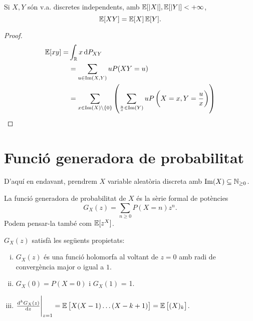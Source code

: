 \begin{lema}
    Si $X,Y$ són v.a. discretes independents, amb $\operatorname{\mathbb{E}}[|X|], \operatorname{\mathbb{E}}[|Y|] < +\infty$,
    \[\operatorname{\mathbb{E}}[XY] = \operatorname{\mathbb{E}}[X]\operatorname{\mathbb{E}}[Y].\]
\end{lema}
\begin{proof}
    \[\begin{aligned}
    \esp[xy] =& \int_\real x\dif P_{XY} \\
    &= \sum_{u\in\im(X,Y)}{uP(XY=u)} \\
    &= \sum_{x\in\im(X)\setminus\{0\}} \lp\sum_{\frac{u}{x}\in\im(Y)} uP\lp X=x,Y=\frac{u}{x} \rp\rp
    \end{aligned}\]
\end{proof}


\section{Funció generadora de probabilitat}
D'aquí en endavant, prendrem $X$ variable aleatòria discreta amb $\operatorname{Im}(X) \subseteq \mathbb{N}_{\geq 0}$.
\begin{defi}
    La funció generadora de probabilitat de $X$ \'es la sèrie formal de potències
    \[G_X(z) = \sum_{n \geq 0} P(X = n) z^n.\]
    Podem pensar-la també com $\operatorname{\mathbb{E}}[z^X]$.
\end{defi}

\begin{prop}
    $G_X(z)$ satisfà les següents propietats:
    \begin{enumerate}[i)]
    \item $G_X(z)$ \'es una funció holomorfa al voltant de $z = 0$ amb radi de convergència
        major o igual a $1$.
    \item $G_X(0) = P(X = 0)$ i $G_X(1)$ = 1.
    \item $\eval{\frac{\text{d}^kG_X(z)}{\text{d}z}}_{z = 1} = 
        \esp\lb X(X-1)\dots(X-k+1)\rb = \esp \lb (X)_k\rb $.
    \end{enumerate}
\end{prop}


